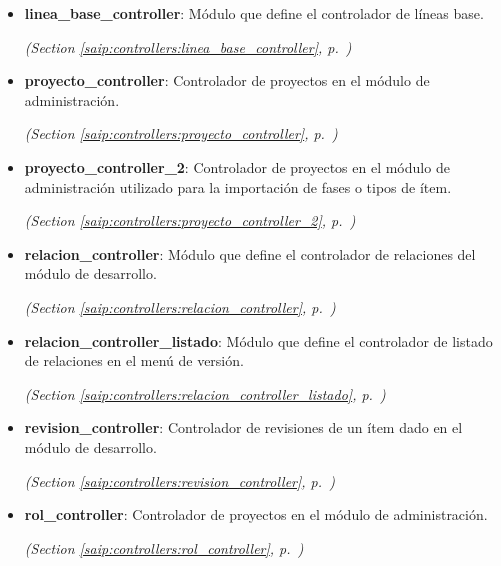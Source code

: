 \begin{itemize}
\item \textbf{linea\_base\_controller}: Módulo que define el controlador de líneas base.



  \textit{(Section \ref{saip:controllers:linea_base_controller}, p.~\pageref{saip:controllers:linea_base_controller})}

\item \textbf{proyecto\_controller}: Controlador de proyectos en el módulo de administración.



  \textit{(Section \ref{saip:controllers:proyecto_controller}, p.~\pageref{saip:controllers:proyecto_controller})}

\item \textbf{proyecto\_controller\_2}: Controlador de proyectos en el módulo de administración utilizado para la 
importación de fases o tipos de ítem.



  \textit{(Section \ref{saip:controllers:proyecto_controller_2}, p.~\pageref{saip:controllers:proyecto_controller_2})}

\item \textbf{relacion\_controller}: Módulo que define el controlador de relaciones del módulo de desarrollo.



  \textit{(Section \ref{saip:controllers:relacion_controller}, p.~\pageref{saip:controllers:relacion_controller})}

\item \textbf{relacion\_controller\_listado}: Módulo que define el controlador de listado de relaciones en el menú de 
versión.



  \textit{(Section \ref{saip:controllers:relacion_controller_listado}, p.~\pageref{saip:controllers:relacion_controller_listado})}

\item \textbf{revision\_controller}: Controlador de revisiones de un ítem dado en el módulo de desarrollo.



  \textit{(Section \ref{saip:controllers:revision_controller}, p.~\pageref{saip:controllers:revision_controller})}

\item \textbf{rol\_controller}: Controlador de proyectos en el módulo de administración.



  \textit{(Section \ref{saip:controllers:rol_controller}, p.~\pageref{saip:controllers:rol_controller})}


\end{itemize}
